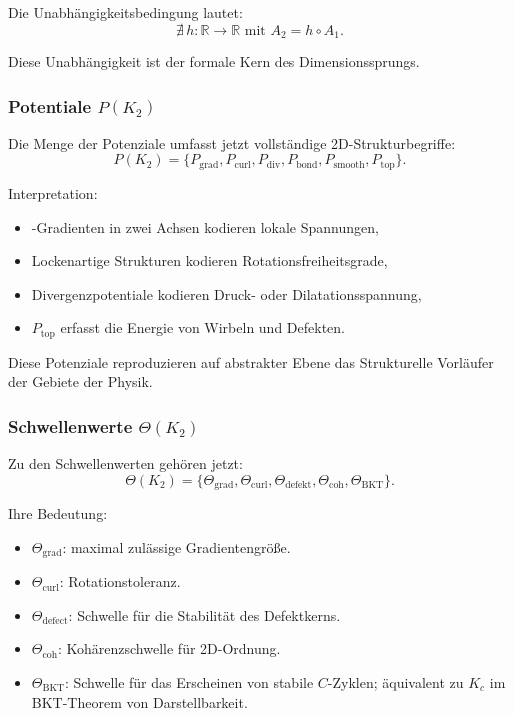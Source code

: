 Die Unabhängigkeitsbedingung lautet:
\[
\nexists\, h: \mathbb{R} \to \mathbb{R} \text{ mit } A_2 = h \circ A_1.
\]

Diese Unabhängigkeit ist der formale Kern des Dimensionssprungs.

\subsubsection{Potentiale \texorpdfstring{$P(K_2)$}{P(K_2)}}

Die Menge der Potenziale umfasst jetzt vollständige 2D-Strukturbegriffe:
\[
P(K_2) =
\{ P_{\mathrm{grad}}, P_{\mathrm{curl}}, P_{\mathrm{div}},
   P_{\mathrm{bond}}, P_{\mathrm{smooth}}, P_{\mathrm{top}} \}.
\]

Interpretation:
\begin{itemize}
    \item-Gradienten in zwei Achsen kodieren lokale Spannungen,
    \item Lockenartige Strukturen kodieren Rotationsfreiheitsgrade,
    \item Divergenzpotentiale kodieren Druck- oder Dilatationsspannung,
    \item $P_{\mathrm{top}}$ erfasst die Energie von Wirbeln und Defekten.
\end{itemize}

Diese Potenziale reproduzieren auf abstrakter Ebene das Strukturelle
Vorläufer der Gebiete der Physik.

\subsubsection{Schwellenwerte \texorpdfstring{$\Theta(K_2)$}{\Theta(K_2)}}

Zu den Schwellenwerten gehören jetzt:
\[
\Theta(K_2) =
\{\Theta_{\mathrm{grad}}, \Theta_{\mathrm{curl}},
  \Theta_{\mathrm{defekt}}, \Theta_{\mathrm{coh}},
  \Theta_{\mathrm{BKT}}\}.
\]

Ihre Bedeutung:
\begin{itemize}
    \item $\Theta_{\mathrm{grad}}$: maximal zulässige Gradientengröße.
    \item $\Theta_{\mathrm{curl}}$: Rotationstoleranz.
    \item $\Theta_{\mathrm{defect}}$: Schwelle für die Stabilität des Defektkerns.
    \item $\Theta_{\mathrm{coh}}$: Kohärenzschwelle für 2D-Ordnung.
    \item $\Theta_{\mathrm{BKT}}$: Schwelle für das Erscheinen von
          stabile $C$-Zyklen; äquivalent zu $K_c$ im BKT-Theorem von
          Darstellbarkeit.
\end{itemize}

